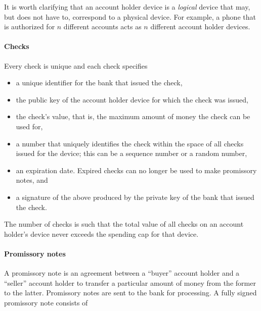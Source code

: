 \documentclass[12pt,a4paper]{article}
\begin{document}
\begin{multicols}{2}
	It is worth clarifying that an account holder device is a \emph{logical} device that may, but does not have to, correspond to a physical device. For example, a phone that is authorized for $n$ different accounts acts as $n$ different account holder devices.

	\paragraph{Checks}
	
	Every check is unique and each check specifies
	
	\begin{itemize}
		\item a unique identifier for the bank that issued the check,
		\item the public key of the account holder device for which the check was issued,
		\item the check's value, that is, the maximum amount of money the check can be used for,
		\item a number that uniquely identifies the check within the space of all checks issued for the device; this can be a sequence number or a random number,
		\item an expiration date. Expired checks can no longer be used to make promissory notes, and
		\item a signature of the above produced by the private key of the bank that issued the check.
	\end{itemize}

	The number of checks is such that the total value of all checks on an account holder's device never exceeds the spending cap for that device.

	\paragraph{Promissory notes}
	
	A promissory note is an agreement between a ``buyer'' account holder and a ``seller'' account holder to transfer a particular amount of money from the former to the latter. Promissory notes are sent to the bank for processing. A fully signed promissory note consists of
	

\end{multicols}
\end{document}
